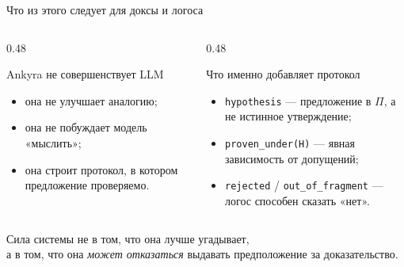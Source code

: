 \documentclass[aspectratio=169,11pt]{beamer}
\newcommand{\Hyp}[1]{\textcolor{hypocolor}{#1}}
\begin{document}
\begin{frame}[shrink=5]{Что из этого следует для доксы и логоса}
  \begin{columns}[T,onlytextwidth]
    \begin{column}{0.48\textwidth}
      \begin{block}{Ankyra не совершенствует LLM}
        \begin{itemize}
          \item она не улучшает аналогию;
          \item она не побуждает модель «мыслить»;
          \item она строит протокол, в котором предложение проверяемо.
        \end{itemize}
      \end{block}
    \end{column}
    \begin{column}{0.48\textwidth}
      \begin{block}{Что именно добавляет протокол}
        \begin{itemize}
          \item \Hyp{\texttt{hypothesis}} --- предложение в \(\Pi\),
                а не истинное утверждение;
          \item \texttt{proven\_under(H)} --- явная зависимость от допущений;
          \item \texttt{rejected} / \texttt{out\_of\_fragment} ---
                логос способен сказать «нет».
        \end{itemize}
      \end{block}
    \end{column}
  \end{columns}

  \vspace{4mm}
  \begin{center}
    \large
    Сила системы не в том, что она лучше угадывает,\\
    а в том, что она \emph{может отказаться} выдавать предположение
    за доказательство.
  \end{center}
\end{frame}
\end{document}

